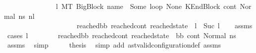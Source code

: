 \begin{isabellebody}
\ \ \ \ \ \ \ \ \ \ \ \ \ \ {\isacharparenleft}{\kern0pt}{\isasymexists}\ l{}{\isachardot}{\kern0pt}\ {\isacharparenleft}{\kern0pt}M{\isacharcomma}{\kern0pt}{\isasymLambda}{\isacharcomma}{\kern0pt}{\isasymGamma}{\isacharcomma}{\kern0pt}{\isasymOmega}{\isacharcomma}{\kern0pt}T\ {\isasymturnstile}{\isacharparenleft}{\kern0pt}{\isacharparenleft}{\kern0pt}BigBlock\ name\ {\isacharbrackleft}{\kern0pt}{\isacharbrackright}{\kern0pt}\ {\isacharparenleft}{\kern0pt}Some\ loop{\isacharparenright}{\kern0pt}\ None{\isacharparenright}{\kern0pt}{\isacharcomma}{\kern0pt}\ KEndBlock\ cont{}{\isacharcomma}{\kern0pt}\ Normal\ ns{\isacharparenright}{\kern0pt}\ {\isacharminus}{\kern0pt}n{\isasymlongrightarrow}{\isacharcircum}{\kern0pt}l{}\ \isanewline
\ \ \ \ \ \ \ \ \ \ \ \ \ \ \ \ \ \ \ \ \ {\isacharparenleft}{\kern0pt}reached{\isacharunderscore}{\kern0pt}bb{\isacharcomma}{\kern0pt}\ reached{\isacharunderscore}{\kern0pt}cont{\isacharcomma}{\kern0pt}\ reached{\isacharunderscore}{\kern0pt}state{\isacharparenright}{\kern0pt}{\isacharparenright}{\kern0pt}\ {\isasymand}\ {\isacharparenleft}{\kern0pt}l\ {\isacharequal}{\kern0pt}\ Suc\ l{}{\isacharparenright}{\kern0pt}{\isacharparenright}{\kern0pt}{\isachardoublequoteclose}\isanewline
%
\isadelimproof
\ \ %
\endisadelimproof
%
\isatagproof
{}\isamarkupfalse%
\ assms\isanewline
{}\isamarkupfalse%
\ {\isacharparenleft}{\kern0pt}cases\ l{\isacharparenright}{\kern0pt}\isanewline
\ \ \isamarkupfalse%
\ {}\isanewline
\ \ \isamarkupfalse%
\ {\isachardoublequoteopen}{\isacharparenleft}{\kern0pt}reached{\isacharunderscore}{\kern0pt}bb{\isacharcomma}{\kern0pt}\ reached{\isacharunderscore}{\kern0pt}cont{\isacharcomma}{\kern0pt}\ reached{\isacharunderscore}{\kern0pt}state{\isacharparenright}{\kern0pt}\ {\isacharequal}{\kern0pt}\ {\isacharparenleft}{\kern0pt}bb{}{\isacharcomma}{\kern0pt}\ cont{}{\isacharcomma}{\kern0pt}\ Normal\ ns{\isacharparenright}{\kern0pt}{\isachardoublequoteclose}\ \isamarkupfalse%
\ assms{\isacharparenleft}{\kern0pt}{}{\isacharparenright}{\kern0pt}\ \isamarkupfalse%
\ simp\isanewline
\ \ \isamarkupfalse%
\ \isamarkupfalse%
\ {\isacharquery}{\kern0pt}thesis\ \isamarkupfalse%
\ {\isacharparenleft}{\kern0pt}simp\ add{\isacharcolon}{\kern0pt}\ ast{\isacharunderscore}{\kern0pt}valid{\isacharunderscore}{\kern0pt}configuration{\isacharunderscore}{\kern0pt}def\ assms{\isacharparenleft}{\kern0pt}{}{\isacharparenright}{\kern0pt}{\isacharparenright}{\kern0pt}\isanewline

\end{isabellebody}
